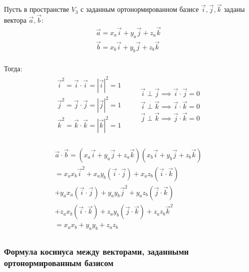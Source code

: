 Пусть в пространстве $V_3$ с заданным ортонормированном базисе $\vec{i}, \vec{j}, \vec{k}$ заданы вектора $\vec{a}, \vec{b}$:
\begin{gather*}
  \vec{a} = x_a \vec{i} + y_a \vec{j} + z_a \vec{k} \\
  \vec{b} = x_b \vec{i} + y_b \vec{j} + z_b \vec{k} \\
\end{gather*}

Тогда:
\begin{gather*}
  \begin{matrix}
    \vec{i}^2 = \vec{i} \cdot \vec{i} = |\vec{i}|^2 = 1 \\
    \vec{j}^2 = \vec{j} \cdot \vec{j} = |\vec{j}|^2 = 1 \\ 
    \vec{k}^2 = \vec{k} \cdot \vec{k} = |\vec{k}|^2 = 1 \\
  \end{matrix}
  \qquad 
  \begin{matrix}
    \vec{i} \perp \vec{j} \implies \vec{i} \cdot \vec{j} = 0 \\ 
    \vec{i} \perp \vec{k} \implies \vec{i} \cdot \vec{k} = 0 \\ 
    \vec{j} \perp \vec{k} \implies \vec{j} \cdot \vec{k} = 0 \\ 
  \end{matrix}
\end{gather*}

\begin{gather*}
  \vec{a} \cdot \vec{b}
  = \left( x_a \vec{i} + y_a \vec{j} + z_a \vec{k} \right) \left( x_b \vec{i} + y_b \vec{j} + z_b \vec{k} \right) \\
  = x_a x_b \vec{i}^2 + x_a y_b (\vec{i} \cdot \vec{j}) + x_a z_b (\vec{i} \cdot \vec{k}) \\
  + y_a x_a (\vec{i} \cdot \vec{j}) + y_a y_b \vec{j}^2 + y_a z_b (\vec{j} \cdot \vec{k}) \\
  + z_a x_b (\vec{i} \cdot \vec{k}) + z_a y_b (\vec{j} \cdot \vec{k}) + z_a z_b \vec{k}^2 \\
  = x_a x_b + y_a y_b + z_a z_b \\
\end{gather*}

\begin{center}
\end{center}



\subsubsection{Формула косинуса между векторами, заданными ортонормированным базисом}

